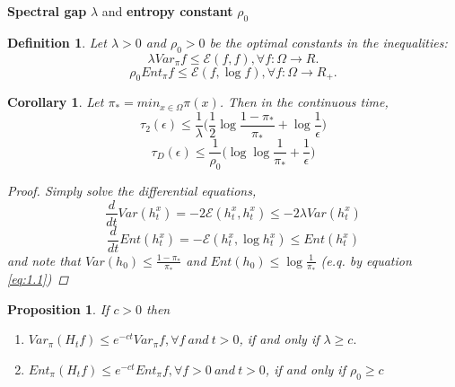 \documentclass[12pt,reqno]{amsart}
\newtheorem{cor}[thm]{Corollary}
\newtheorem{prop}[thm]{Proposition}
\newtheorem{definition}[thm]{Definition}
{ \theoremstyle{remark}\newtheorem*{remark}{Remark} }
\begin{document}
\textbf{Spectral gap} $\lambda$ and \textbf{entropy constant } $\rho_0$
\begin{definition}
  Let $\lambda > 0$ and $\rho_0 > 0$ be the optimal constants in the inequalities:
  \begin{equation}
    \label{eq:specral_gap}
    \lambda Var_{\pi}f \leq \mathcal{E}(f,f), \forall f:\Omega \rightarrow R.
  \end{equation}
  \begin{equation}
    \label{eq:entropy_constant}
    \rho_0 Ent_{\pi}f \leq \mathcal{E}(f,\log f), \forall f:\Omega \rightarrow R_+.
  \end{equation}
\end{definition}

\begin{cor}
  Let $\pi_* = min_{x\in \Omega}\pi(x)$. Then in the continuous time,
  \begin{equation}
    \tau_2(\epsilon) \leq \frac{1}{\lambda}\big(\frac{1}{2}\log \frac{1-\pi_*}{\pi_*} + \log
    \frac{1}{\epsilon} \big)
  \end{equation}
  \begin{equation}
    \tau_D(\epsilon) \leq \frac{1}{\rho_0}\big(\log \log \frac{1}{\pi_*} + \frac{1}{\epsilon} \big)
  \end{equation}
  \begin{proof}
    Simply solve the differential equations,
    \begin{equation}
      \frac{d}{dt}Var(h_t^x) = -2 \mathcal{E}(h_t^x,h_t^x) \leq -2\lambda Var(h_t^x) 
    \end{equation}
    \begin{equation}
      \frac{d}{dt}Ent(h_t^x) = - \mathcal{E}(h_t^x,\log h_t^x) \leq Ent(h_t^x)
    \end{equation}
and note that $Var(h_0) \leq \frac{1-\pi_*}{\pi_*}$ and $Ent(h_0)\leq \log \frac{1}{\pi_*}$
(e.q. by equation \eqref{eq:1.1})
  \end{proof}
\end{cor}

\begin{prop}
If $c > 0$ then
  \begin{enumerate}
  \item $Var_{\pi}(H_tf)\leq e^{-ct}Var_{\pi}f, \forall f ~and~ t > 0$, if and only if $\lambda\geq c.$
  \item $Ent_{\pi}(H_tf)\leq e^{-ct}Ent_{\pi}f, \forall f>0 ~and~ t > 0$, if and only if $\rho_0 \geq c$
  \end{enumerate}
\end{prop}
\end{document}
